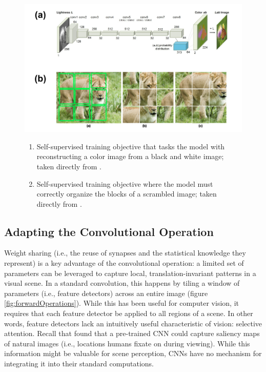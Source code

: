 \documentclass[12pt]{article}
\let\oldtextcite=\textcite
\renewcommand{\textcite}[1]{\textcolor[rgb]{0, .121, .388}{\oldtextcite{#1}}}
\begin{document}
\begin{figure}[!h]
    \centering
    \includegraphics[scale=.4]{figures/selfsupervised.png}
    \caption{}
        \begin{enumerate}[label=(\alph*)]
            \item Self-supervised training objective that tasks the model with reconstructing a color image from a black and white image; taken directly from \textcite{zhang2016colorful}. 
            \item Self-supervised training objective where the model must correctly organize the blocks of a scrambled image; taken directly from \textcite{noroozi2016unsupervised}.
        \end{enumerate}
    \label{fig:selfsupervised}
\end{figure} 

\subsection{Adapting the Convolutional Operation}

Weight sharing (i.e., the reuse of synapses and the statistical knowledge they represent) is a key advantage of the convolutional operation: a limited set of parameters can be leveraged to capture local, translation-invariant patterns in a visual scene. In a standard convolution, this happens by tiling a window of parameters (i.e., feature detectors) across an entire image (figure \ref{fig:forwardOperations}). While this has been useful for computer vision, it requires that each feature detector be applied to all regions of a scene. In other words, feature detectors lack an intuitively useful characteristic of vision: selective attention. Recall that \textcite{kummerer2014deep} found that a pre-trained CNN could capture saliency maps of natural images (i.e., locations humans fixate on during viewing). While this information might be valuable for scene perception, CNNs have no mechanism for integrating it into their standard computations. 
\end{document}
